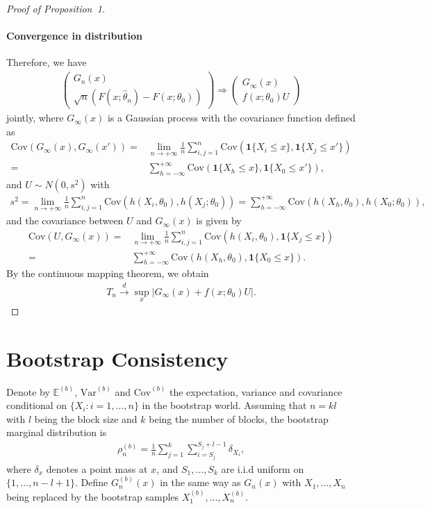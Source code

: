 \documentclass[12pt]{article}
\begin{document}
\begin{proof}[Proof of Proposition~1]
\paragraph{Convergence in distribution}
Therefore, we have
\begin{align*}
\begin{pmatrix}
G_n(x)  \\ 
\sqrt{n}(F(x;\hat{\theta}_n)-F(x;\theta_0))
\end{pmatrix}\Rightarrow
\begin{pmatrix}
G_{\infty}(x) \\
f(x;\theta_0)U
\end{pmatrix}
\end{align*}
jointly, where $G_{\infty}(x)$ is a Gaussian process with the covariance 
function defined as
\begin{align*}
\text{Cov}(G_{\infty}(x),G_{\infty}(x'))=& 
\lim_{n\rightarrow+\infty}\frac{1}{n}\sum^{n}_{i,j=1}
\text{Cov}(\mathbf{1}\{X_i\leq x\},\mathbf{1}\{X_j\leq x'\})
\\=& \sum^{+\infty}_{h=-\infty}\text{Cov}(\mathbf{1}\{X_{h}\leq x\},
\mathbf{1}\{X_0\leq x'\}),
\end{align*}
and $U\sim N(0,s^2)$ with 
\begin{align*}
s^2=\lim_{n\rightarrow+\infty}\frac{1}{n}\sum^{n}_{i,j=1}\text{Cov}(h(X_i,
\theta_0),h(X_j;\theta_0))
= \sum^{+\infty}_{h=-\infty}\text{Cov}(h(X_{h},\theta_0),h(X_0;\theta_0)),
\end{align*}
and the covariance between $U$ and $G_{\infty}(x)$ is given by
\begin{align*}
\text{Cov}(U,G_\infty(x))=&\lim_{n\rightarrow+\infty}
\frac{1}{n}\sum^{n}_{i,j=1}\text{Cov}(h(X_i,\theta_0),\mathbf{1}\{X_j\leq x\})
\\=&\sum^{+\infty}_{h=-\infty}
\text{Cov}(h(X_{h},\theta_0),\mathbf{1}\{X_0\leq x\}).
\end{align*}
By the continuous mapping theorem, we obtain
\begin{align*}
T_n \overset{d}{\rightarrow} \sup_x |G_{\infty}(x)+f(x;\theta_0)U|.    
\end{align*}

\end{proof}

\section{Bootstrap Consistency}

Denote by $\mathbb{E}^{(b)}$, $\text{Var}^{(b)}$ and $\text{Cov}^{(b)}$
the expectation, variance and covariance conditional on 
$\{X_i: i = 1, \ldots, n\}$ in 
the bootstrap world. Assuming that $n=kl$ with $l$ being the block size and $k$ 
being the number of blocks, the bootstrap marginal distribution is 
\begin{align*}
\rho_n^{(b)}=\frac{1}{n}\sum^{k}_{j=1}\sum^{S_j+l-1}_{i=S_j} \delta_{X_i},    
\end{align*}
where $\delta_x$ denotes a point mass at $x$, and $S_1,\dots,S_k$ are i.i.d 
uniform on $\{1,\dots,n-l+1\}$. 
Define $G_n^{(b)}(x)$ in the same way as $G_n(x)$ with $X_1, \dots, X_n$ being 
replaced by the bootstrap samples $X_1^{(b)},\dots,X_n^{(b)}.$
\end{document}
